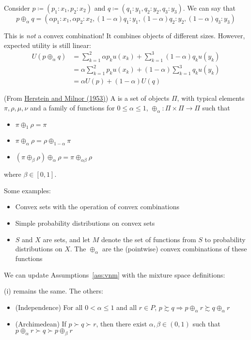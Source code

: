 \documentclass[12pt]{article}
\begin{document}
\begin{example}
	Consider $p \coloneqq (p_1:x_1,p_2:x_2)$ and $q\coloneqq (q_1:y_1,q_2:y_2,q_3:y_3)$. We can say that
	\[
	p\oplus_\alpha q = (\alpha p_1:x_1, \alpha p_2: x_2,(1-\alpha)q_1:y_1, (1-\alpha)q_2:y_2, (1-\alpha)q_3:y_3)
	\]
	\begin{remark}
		This is \emph{not} a convex combination! It combines objects of different sizes. However, expected utility is still linear:
		\begin{align*}
			U(p \oplus_\alpha q) &= \sum_{k=1}^2 \alpha p_k u(x_k) + \sum_{k=1}^3 (1-\alpha)q_ku(y_k) \\
			&= \alpha \sum_{k=1}^2 p_k u(x_k) +(1-\alpha) \sum_{k=1}^3 q_ku(y_k) \\
			&= \alpha U(p) + (1-\alpha)U(q)
		\end{align*}
	\end{remark}
\end{example}

\begin{definition}
	(From \href{https://www.jstor.org/stable/1905540}{Herstein and Milnor (1953)}) A  is a set of objects $\Pi$, with typical elements $\pi,\rho,\mu,\nu$ and a family of functions for $0 \le \alpha \le 1$, $\oplus_\alpha : \Pi \times \Pi \to \Pi$ such that
	\begin{itemize}
		\item[(i)] $\pi \oplus_1 \rho = \pi$
		\item[(ii)] $\pi \oplus_\alpha \rho = \rho \oplus_{1-\alpha} \pi$
		\item[(iii)] $(\pi \oplus_\beta \rho) \oplus_\alpha \rho = \pi \oplus_{\alpha\beta} \rho$
	\end{itemize}
	where $\beta \in [0,1]$.
\end{definition}

Some examples:
\begin{itemize}
	\item Convex sets with the operation of convex combinations
	\item Simple probability distributions on convex sets
	\item $S$ and $X$ are sets, and let $M$ denote the set of functions from $S$ to probability distributions on $X$. The $\oplus_\alpha$ are the (pointwise) convex combinations of these functions
\end{itemize}

We can update Assumptions~\ref{ass:vnm} with the mixture space definitions:
\begin{assumption}\label{ass:vnm_mix}
	(i) remains the same. The others:
	
	\begin{itemize}
		\item[(ii)] (Independence) For all $0 < \alpha \le 1$ and all $r \in P$, $p \succsim q \Longrightarrow p \oplus_\alpha r \succsim q \oplus_\alpha r$
		
		\item[(iii)] (Archimedean) If $p \succ q \succ r$, then there exist $\alpha,\beta \in (0,1)$ such that $p \oplus_\alpha r \succ q \succ p \oplus_\beta r$
	\end{itemize}
\end{assumption}
\end{document}
